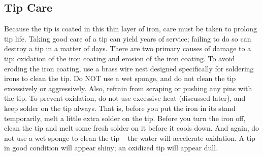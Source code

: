 \subsection{Tip Care}
Because the tip is coated in this thin layer of iron, care must be taken to prolong tip life. Taking good care of a tip can yield years of service; failing to do so can destroy a tip in a matter of days. There are two primary causes of damage to a tip: oxidation of the iron coating and erosion of the iron coating. To avoid eroding the iron coating, use a brass wire nest designed specifically for soldering irons to clean the tip. Do NOT use a wet sponge, and do not clean the tip excessively or aggressively. Also, refrain from scraping or pushing any pins with the tip. To prevent oxidation, do not use excessive heat (discussed later), and keep solder on the tip always. That is, before you put the iron in its stand temporarily, melt a little extra solder on the tip. Before you turn the iron off, clean the tip and melt some fresh solder on it before it cools down. And again, do not use a wet sponge to clean the tip – the water will accelerate oxidation. A tip in good condition will appear shiny; an oxidized tip will appear dull.
